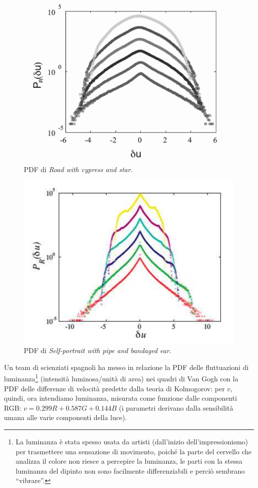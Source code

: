 \documentclass[12pt,a4paper]{article}
\numberwithin{equation}{section}
\begin{document}
\begin{figure}
    \centering
    \includegraphics[scale=0.4]{PDF_road.png}
    \caption{PDF di \emph{Road with cypress and star}.}
    \label{roadpdf}
\end{figure}

\begin{figure}
    \centering
    \includegraphics[scale=0.4]{PDF_self_portrait.png}
    \caption{PDF di \emph{Self-portrait with pipe and bandaged ear}.}
    \label{selfpdf}
\end{figure}


Un team di scienziati spagnoli \cite{study2006} ha messo in relazione la PDF delle fluttuazioni di luminanza\footnote{La luminanza è stata spesso usata da artisti (dall'inizio dell'impressionismo) per trasmettere una sensazione di movimento, poiché la parte del cervello che analizza il colore non riesce a percepire la luminanza, le parti con la stessa luminanza del dipinto non sono facilmente differenziabili e perciò sembrano ``vibrare''.} (intensità luminosa/unità di area) nei quadri di Van Gogh con la PDF delle differenze di velocità predette dalla teoria di Kolmogorov: per $v$, quindi, ora intendiamo luminanza, misurata come funzione dalle componenti RGB: $v = 0.299 R + 0.587 G + 0.144B$ (i parametri derivano dalla sensibilità umana alle varie componenti della luce).
\end{document}
